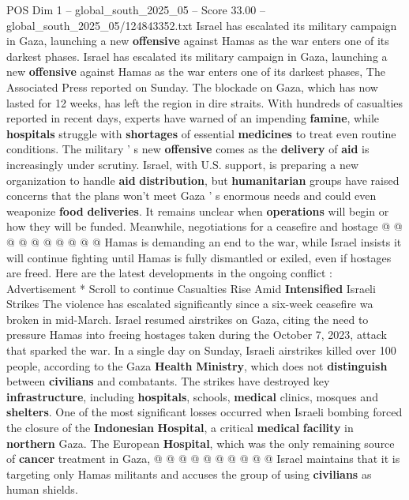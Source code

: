 \begin{textsample}{POS Dim 1 – global\_south\_2025\_05 – Score 33.00 – global\_south\_2025\_05/124843352.txt}  \label{ex:f1_pos_062}
Israel has escalated its military campaign in Gaza, launching a new \textbf{offensive} against Hamas as the war enters one of its darkest phases.
Israel has escalated its military campaign in Gaza, launching a new \textbf{offensive} against Hamas as the war enters one of its darkest phases, The Associated Press reported on Sunday.
The blockade on Gaza, which has now lasted for 12 weeks, has left the region in dire straits.
With hundreds of casualties reported in recent days, experts have warned of an impending \textbf{famine}, while \textbf{hospitals} struggle with \textbf{shortages} of essential \textbf{medicines} to treat even routine conditions.
The military ' s new \textbf{offensive} comes as the \textbf{delivery} of \textbf{aid} is increasingly under scrutiny.
Israel, with U.S. support, is preparing a new organization to handle \textbf{aid} \textbf{distribution}, but \textbf{humanitarian} groups have raised concerns that the plans won't meet Gaza ' s enormous needs and could even weaponize \textbf{food} \textbf{deliveries}.
It remains unclear when \textbf{operations} will begin or how they will be funded.
Meanwhile, negotiations for a ceasefire and hostage @ @ @ @ @ @ @ @ @ @ Hamas is demanding an end to the war, while Israel insists it will continue fighting until Hamas is fully dismantled or exiled, even if hostages are freed.
Here are the latest developments in the ongoing conflict : Advertisement * Scroll to continue Casualties Rise Amid \textbf{Intensified} Israeli Strikes The violence has escalated significantly since a six-week ceasefire wa broken in mid-March.
Israel resumed airstrikes on Gaza, citing the need to pressure Hamas into freeing hostages taken during the October 7, 2023, attack that sparked the war.
In a single day on Sunday, Israeli airstrikes killed over 100 people, according to the Gaza \textbf{Health} \textbf{Ministry}, which does not \textbf{distinguish} between \textbf{civilians} and combatants.
The strikes have destroyed key \textbf{infrastructure}, including \textbf{hospitals}, schools, \textbf{medical} clinics, mosques and \textbf{shelters}.
One of the most significant losses occurred when Israeli bombing forced the closure of the \textbf{Indonesian} \textbf{Hospital}, a critical \textbf{medical} \textbf{facility} in \textbf{northern} Gaza.
The European \textbf{Hospital}, which was the only remaining source of \textbf{cancer} treatment in Gaza, @ @ @ @ @ @ @ @ @ @ Israel maintains that it is targeting only Hamas militants and accuses the group of using \textbf{civilians} as human shields.

\end{textsample}
